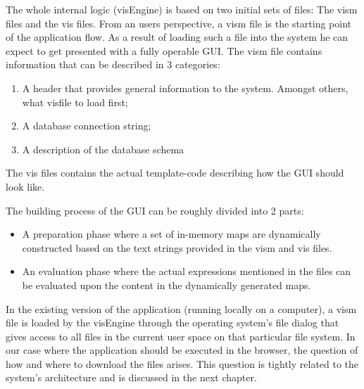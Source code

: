 The whole internal logic (visEngine) is based on two initial sets of files: The vism files and the vis files.
From an users perspective, a vism file is the starting point of the application flow. As a result of loading such a file into the system he can expect to get presented with a fully operable GUI. The vism file contains information that can be described in 3 categories:

\begin{enumerate}
    \item A header that provides general information to the system. Amongst others, what visfile to load first;
    \item A database connection string;
    \item A description of the database schema
\end{enumerate}

The vis files contains the actual template-code describing how the GUI should look like.

The building process of the GUI can be roughly divided into 2 parts:
\begin{itemize}
    \item A preparation phase where a set of in-memory maps are dynamically constructed based on the text strings provided in the vism and vis files.
    \item An evaluation phase where the actual expressions mentioned in the files can be evaluated upon the content in the dynamically generated maps.
\end{itemize}

In the existing version of the application (running locally on a computer), a vism file is loaded by the visEngine through the operating system's file dialog that gives access to all files in the current user space on that particular file system. In our case where the application should be executed in the browser, the question of how and where to download the files arises. This question is tightly related to the system's architecture and is discussed in the next chapter.

\fi